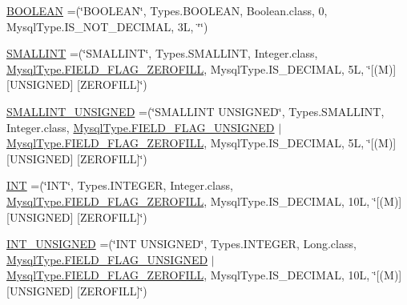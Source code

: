 \begin{DoxyCompactItemize}
\item 
\mbox{\hyperlink{enumcom_1_1mysql_1_1cj_1_1_mysql_type_a009ae534b2a4c9a6e60837c1ca1e53b9}{B\+O\+O\+L\+E\+AN}} =(\char`\"{}B\+O\+O\+L\+E\+AN\char`\"{}, Types.\+B\+O\+O\+L\+E\+AN, Boolean.\+class, 0, Mysql\+Type.\+I\+S\+\_\+\+N\+O\+T\+\_\+\+D\+E\+C\+I\+M\+AL, 3\+L, \char`\"{}\char`\"{})
\item 
\mbox{\hyperlink{enumcom_1_1mysql_1_1cj_1_1_mysql_type_a6f47bd8cc33374c77f4af4d1b9758081}{S\+M\+A\+L\+L\+I\+NT}} =(\char`\"{}S\+M\+A\+L\+L\+I\+NT\char`\"{}, Types.\+S\+M\+A\+L\+L\+I\+NT, Integer.\+class, \mbox{\hyperlink{enumcom_1_1mysql_1_1cj_1_1_mysql_type_abb76a1f2f3dac9a30d1b559b8ba66a48}{Mysql\+Type.\+F\+I\+E\+L\+D\+\_\+\+F\+L\+A\+G\+\_\+\+Z\+E\+R\+O\+F\+I\+LL}}, Mysql\+Type.\+I\+S\+\_\+\+D\+E\+C\+I\+M\+AL, 5\+L, \char`\"{}\mbox{[}(\+M)\mbox{]} \mbox{[}\+U\+N\+S\+I\+G\+N\+E\+D\mbox{]} \mbox{[}\+Z\+E\+R\+O\+F\+I\+L\+L\mbox{]}\char`\"{})
\item 
\mbox{\hyperlink{enumcom_1_1mysql_1_1cj_1_1_mysql_type_ae37a6ba8bf5532916dded17e40a94216}{S\+M\+A\+L\+L\+I\+N\+T\+\_\+\+U\+N\+S\+I\+G\+N\+ED}} =(\char`\"{}S\+M\+A\+L\+L\+I\+NT U\+N\+S\+I\+G\+N\+ED\char`\"{}, Types.\+S\+M\+A\+L\+L\+I\+NT, Integer.\+class, \mbox{\hyperlink{enumcom_1_1mysql_1_1cj_1_1_mysql_type_a2c6701614559b1ad9955cdc4ca6337e2}{Mysql\+Type.\+F\+I\+E\+L\+D\+\_\+\+F\+L\+A\+G\+\_\+\+U\+N\+S\+I\+G\+N\+ED}} $\vert$ \mbox{\hyperlink{enumcom_1_1mysql_1_1cj_1_1_mysql_type_abb76a1f2f3dac9a30d1b559b8ba66a48}{Mysql\+Type.\+F\+I\+E\+L\+D\+\_\+\+F\+L\+A\+G\+\_\+\+Z\+E\+R\+O\+F\+I\+LL}}, Mysql\+Type.\+I\+S\+\_\+\+D\+E\+C\+I\+M\+AL, 5\+L, \char`\"{}\mbox{[}(\+M)\mbox{]} \mbox{[}\+U\+N\+S\+I\+G\+N\+E\+D\mbox{]} \mbox{[}\+Z\+E\+R\+O\+F\+I\+L\+L\mbox{]}\char`\"{})
\item 
\mbox{\hyperlink{enumcom_1_1mysql_1_1cj_1_1_mysql_type_a01116c8fe484233659c251ee68f56d25}{I\+NT}} =(\char`\"{}I\+NT\char`\"{}, Types.\+I\+N\+T\+E\+G\+ER, Integer.\+class, \mbox{\hyperlink{enumcom_1_1mysql_1_1cj_1_1_mysql_type_abb76a1f2f3dac9a30d1b559b8ba66a48}{Mysql\+Type.\+F\+I\+E\+L\+D\+\_\+\+F\+L\+A\+G\+\_\+\+Z\+E\+R\+O\+F\+I\+LL}}, Mysql\+Type.\+I\+S\+\_\+\+D\+E\+C\+I\+M\+AL, 10\+L, \char`\"{}\mbox{[}(\+M)\mbox{]} \mbox{[}\+U\+N\+S\+I\+G\+N\+E\+D\mbox{]} \mbox{[}\+Z\+E\+R\+O\+F\+I\+L\+L\mbox{]}\char`\"{})
\item 
\mbox{\hyperlink{enumcom_1_1mysql_1_1cj_1_1_mysql_type_aa15735863c9115877dc4d1f2c7690035}{I\+N\+T\+\_\+\+U\+N\+S\+I\+G\+N\+ED}} =(\char`\"{}I\+NT U\+N\+S\+I\+G\+N\+ED\char`\"{}, Types.\+I\+N\+T\+E\+G\+ER, Long.\+class, \mbox{\hyperlink{enumcom_1_1mysql_1_1cj_1_1_mysql_type_a2c6701614559b1ad9955cdc4ca6337e2}{Mysql\+Type.\+F\+I\+E\+L\+D\+\_\+\+F\+L\+A\+G\+\_\+\+U\+N\+S\+I\+G\+N\+ED}} $\vert$ \mbox{\hyperlink{enumcom_1_1mysql_1_1cj_1_1_mysql_type_abb76a1f2f3dac9a30d1b559b8ba66a48}{Mysql\+Type.\+F\+I\+E\+L\+D\+\_\+\+F\+L\+A\+G\+\_\+\+Z\+E\+R\+O\+F\+I\+LL}}, Mysql\+Type.\+I\+S\+\_\+\+D\+E\+C\+I\+M\+AL, 10\+L, \char`\"{}\mbox{[}(\+M)\mbox{]} \mbox{[}\+U\+N\+S\+I\+G\+N\+E\+D\mbox{]} \mbox{[}\+Z\+E\+R\+O\+F\+I\+L\+L\mbox{]}\char`\"{})

\end{DoxyCompactItemize}

